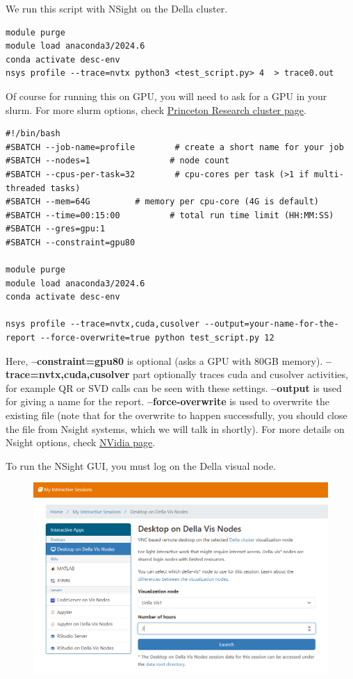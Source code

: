 We run this script with NSight on the Della cluster. 

\begin{verbatim}
module purge
module load anaconda3/2024.6
conda activate desc-env
nsys profile --trace=nvtx python3 <test_script.py> 4  > trace0.out 
\end{verbatim}


Of course for running this on GPU, you will need to ask for a GPU in your slurm. For more slurm options, check \href{https://researchcomputing.princeton.edu/support/knowledge-base/slurm}{Princeton Research cluster page}.

\begin{verbatim}
#!/bin/bash
#SBATCH --job-name=profile        # create a short name for your job
#SBATCH --nodes=1                # node count
#SBATCH --cpus-per-task=32        # cpu-cores per task (>1 if multi-threaded tasks)
#SBATCH --mem=64G         # memory per cpu-core (4G is default)
#SBATCH --time=00:15:00          # total run time limit (HH:MM:SS)
#SBATCH --gres=gpu:1
#SBATCH --constraint=gpu80

module purge
module load anaconda3/2024.6
conda activate desc-env

nsys profile --trace=nvtx,cuda,cusolver --output=your-name-for-the-report --force-overwrite=true python test_script.py 12
\end{verbatim}

Here, \textbf{--constraint=gpu80} is optional (asks a GPU with 80GB memory). \textbf{--trace=nvtx,cuda,cusolver} part optionally traces cuda and cusolver activities, for example QR or SVD calls can be seen with these settings. \textbf{--output} is used for giving a name for the report. \textbf{--force-overwrite} is used to overwrite the existing file (note that for the overwrite to happen successfully, you should close the file from Nsight systems, which we will talk in shortly). For more details on Nsight options, check \href{https://docs.nvidia.com/nsight-systems/UserGuide/}{NVidia page}.

To run the NSight GUI, you must log on the Della visual node. 
\begin{figure}[H]
    \centering
    \includegraphics[width=0.5\linewidth]{figures/della-visnode.png}
\end{figure}

